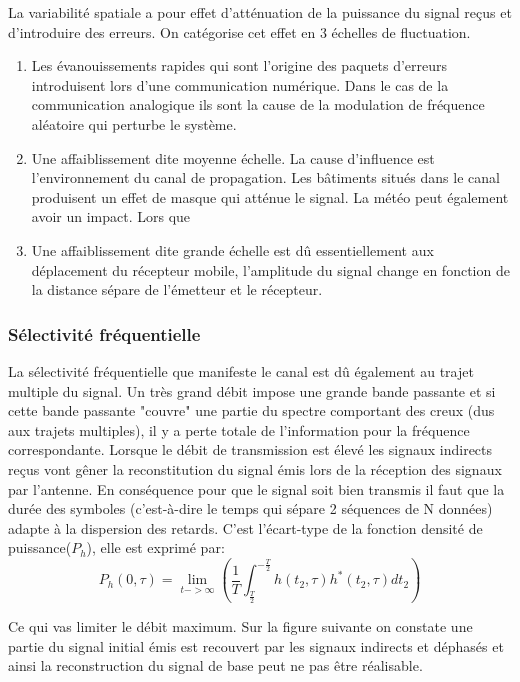 La variabilité spatiale a pour effet d'atténuation de la puissance du signal reçus et d'introduire des erreurs. On catégorise cet effet en 3 échelles de fluctuation.\\
\begin{enumerate}
\item Les évanouissements rapides qui sont l'origine des paquets d'erreurs introduisent lors d'une communication numérique. Dans le cas de la communication analogique ils sont la cause de la modulation de fréquence aléatoire qui perturbe le système.

\item Une affaiblissement dite moyenne échelle. La cause d'influence est l'environnement du canal de propagation. Les bâtiments situés dans le canal produisent un effet de masque qui atténue le signal. La météo peut également avoir un impact. Lors que 

\item Une affaiblissement dite grande échelle est dû essentiellement aux déplacement du récepteur mobile, l'amplitude du signal change en fonction de la distance sépare de l'émetteur et le récepteur.

\end{enumerate}
\subsubsection{Sélectivité fréquentielle}

La sélectivité fréquentielle que manifeste le canal est dû également au trajet multiple du signal. Un très grand débit impose une grande bande passante et si cette bande passante "couvre" une partie du spectre comportant des creux (dus aux trajets multiples), il y a perte totale de l'information pour la fréquence correspondante. Lorsque le débit de transmission est élevé les signaux indirects reçus vont gêner la reconstitution du signal émis lors de la réception des signaux par l'antenne. En conséquence pour que le signal soit bien transmis il faut que la durée des symboles (c'est-à-dire le temps qui sépare 2 séquences de N données) adapte à la dispersion des retards. C'est l'écart-type de la fonction densité de puissance($P_h$), elle est exprimé par:\\
\[ P_h(0,\tau)=\lim_{t->\infty}(\frac{1}{T}\int_{\frac{T}{2}}^{-\frac{T}{2}}h(t_2,\tau)h^{*}(t_2,\tau)dt_2) \]

 Ce qui vas limiter le débit maximum. Sur la figure suivante on constate une partie du signal initial émis est recouvert par les signaux indirects et déphasés et ainsi la reconstruction du signal de base peut ne pas être réalisable.
\\
